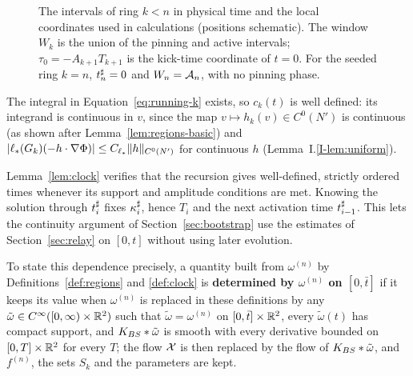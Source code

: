 \begin{figure}[H]
\centering
{}
\caption{The intervals of ring $k<n$ in physical time and the local coordinates used in calculations
(positions schematic). The window $W_k$ is the union of the pinning and active
intervals; $\tau_0=-A_{k+1}T_{k+1}$ is the kick-time coordinate of $t=0$.
For the seeded ring $k=n$, $t^\sharp_n=0$ and $W_n=\mathcal{A}_n$, with no
pinning phase.}
\label{fig:ring-clock}
\end{figure}

The integral in Equation~\eqref{eq:running-k} exists, so $c_k(t)$ is well
defined: its integrand is continuous in $v$, since the map
$v\mapsto h_k(v)\in C^0(N')$ is continuous (as shown after
Lemma~\ref{lem:regions-basic}) and
$|\ell_*(G_k)(-h\cdot\nabla\Phi)|\le C_{\ell_*}\|h\|_{C^0(N')}$ for continuous $h$
(Lemma~I.\ref{I-lem:uniform}).

Lemma~\ref{lem:clock} verifies that the recursion gives well-defined,
strictly ordered times whenever its support and amplitude conditions are met.
Knowing the solution through $t^\sharp_i$ fixes $\kappa^\sharp_i$, hence $T_i$ and the next
activation time $t^\sharp_{i-1}$. This lets the continuity argument of
Section~\ref{sec:bootstrap} use the estimates of Section~\ref{sec:relay}
on $[0,t]$ without using later evolution.

To state this dependence precisely, a quantity built from $\omega^{(n)}$ by
Definitions~\ref{def:regions} and \ref{def:clock} is
\textbf{determined by $\omega^{(n)}$ on $[0,\bar t]$} if it keeps its value when
$\omega^{(n)}$ is replaced in these definitions by any
$\tilde\omega\in C^\infty([0,\infty)\times\mathbb{R}^2)$ such that $\tilde\omega=\omega^{(n)}$
on $[0,\bar t]\times\mathbb{R}^2$, every $\tilde\omega(t)$ has compact support, and
$K_{BS}\ast\tilde\omega$ is smooth with every derivative bounded on $[0,T]\times\mathbb{R}^2$
for every $T$; the flow $\mathcal{X}$ is then replaced by the flow of
$K_{BS}\ast\tilde\omega$, and $f^{(n)}$, the sets $S_k$ and the parameters are kept.

